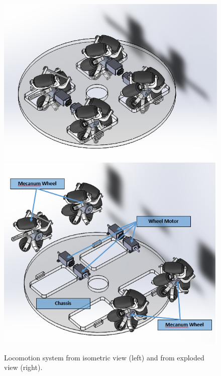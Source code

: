 \begin{figure}
\centering
\includegraphics[width=0.9\columnwidth]{hardware/CAD/Locomotion System/Locomotion.PNG}
\includegraphics[width=0.9\columnwidth]{hardware/CAD/Locomotion System/Locomotion_Exploded.PNG}
\caption{Locomotion system from isometric view (left) and from exploded view (right).}
\label{fig:locomotion-diagram}
\end{figure}

